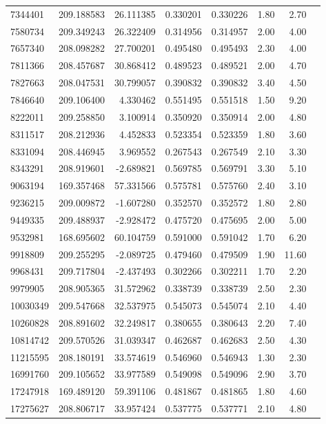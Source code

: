 \begin{longtable}{lrrrrrrr}
7344401 & 209.188583 & 26.111385 & 0.330201 & 0.330226 & 1.80 & 2.70 \\
7580734 & 209.349243 & 26.322409 & 0.314956 & 0.314957 & 2.00 & 4.00 \\
7657340 & 208.098282 & 27.700201 & 0.495480 & 0.495493 & 2.30 & 4.00 \\
7811366 & 208.457687 & 30.868412 & 0.489523 & 0.489521 & 2.00 & 4.70 \\
7827663 & 208.047531 & 30.799057 & 0.390832 & 0.390832 & 3.40 & 4.50 \\
7846640 & 209.106400 & 4.330462 & 0.551495 & 0.551518 & 1.50 & 9.20 \\
8222011 & 209.258850 & 3.100914 & 0.350920 & 0.350914 & 2.00 & 4.80 \\
8311517 & 208.212936 & 4.452833 & 0.523354 & 0.523359 & 1.80 & 3.60 \\
8331094 & 208.446945 & 3.969552 & 0.267543 & 0.267549 & 2.10 & 3.30 \\
8343291 & 208.919601 & -2.689821 & 0.569785 & 0.569791 & 3.30 & 5.10 \\
9063194 & 169.357468 & 57.331566 & 0.575781 & 0.575760 & 2.40 & 3.10 \\
9236215 & 209.009872 & -1.607280 & 0.352570 & 0.352572 & 1.80 & 2.80 \\
9449335 & 209.488937 & -2.928472 & 0.475720 & 0.475695 & 2.00 & 5.00 \\
9532981 & 168.695602 & 60.104759 & 0.591000 & 0.591042 & 1.70 & 6.20 \\
9918809 & 209.255295 & -2.089725 & 0.479460 & 0.479509 & 1.90 & 11.60 \\
9968431 & 209.717804 & -2.437493 & 0.302266 & 0.302211 & 1.70 & 2.20 \\
9979905 & 208.905365 & 31.572962 & 0.338739 & 0.338739 & 2.50 & 2.30 \\
10030349 & 209.547668 & 32.537975 & 0.545073 & 0.545074 & 2.10 & 4.40 \\
10260828 & 208.891602 & 32.249817 & 0.380655 & 0.380643 & 2.20 & 7.40 \\
10814742 & 209.570526 & 31.039347 & 0.462687 & 0.462683 & 2.50 & 4.30 \\
11215595 & 208.180191 & 33.574619 & 0.546960 & 0.546943 & 1.30 & 2.30 \\
16991760 & 209.105652 & 33.977589 & 0.549098 & 0.549096 & 2.90 & 3.70 \\
17247918 & 169.489120 & 59.391106 & 0.481867 & 0.481865 & 1.80 & 4.60 \\
17275627 & 208.806717 & 33.957424 & 0.537775 & 0.537771 & 2.10 & 4.80 \\

\end{longtable}

